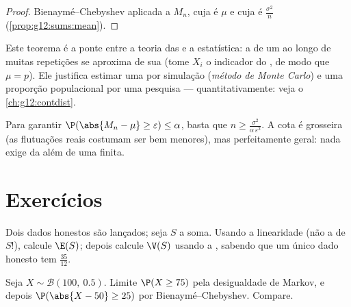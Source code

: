 \begin{proof}
Bienaymé--Chebyshev aplicada a $M_n$, cuja  é $\mu$ e cuja
 é $\frac{\sigma^2}{n}$ (\cref{prop:g12:sums:mean}).
\end{proof}

\begin{remark}
Este teorema é a ponte entre a teoria das  e a estatística:
a \emph{} de um  ao longo de muitas repetições
 se aproxima de sua \emph{} (tome $X_i$ o
indicador do , de modo que $\mu = p$). Ele justifica estimar uma
 por simulação (\emph{método de Monte Carlo}) e uma proporção
populacional por uma pesquisa --- quantitativamente: veja o
\cref{ch:g12:contdist}.
\end{remark}

\begin{method}\label{met:g12:sums:chebyshev}
Para garantir $\P(\abs{M_n - \mu} \geq \varepsilon) \leq \alpha$, basta
que $n \geq \frac{\sigma^2}{\alpha\,\varepsilon^2}$. A cota é grosseira
(as flutuações reais costumam ser bem menores), mas perfeitamente geral:
nada exige da  além de uma  finita.
\end{method}

\section{Exercícios}

\begin{exercise}[$\star$]\label{exo:g12:sums:1}
Dois dados honestos são lançados; seja $S$ a soma. Usando a linearidade
(não a  de $S$!), calcule $\E(S)$; depois calcule $\V(S)$
usando a , sabendo que um único dado honesto tem 
$\frac{35}{12}$.
\end{exercise}

\begin{exercise}[$\star$]\label{exo:g12:sums:2}
Seja $X \sim \mathcal B(100,\ 0.5)$. Limite $\P(X \geq 75)$ pela
desigualdade de Markov, e depois $\P(\abs{X - 50} \geq 25)$ por
Bienaymé--Chebyshev. Compare.
\end{exercise}


